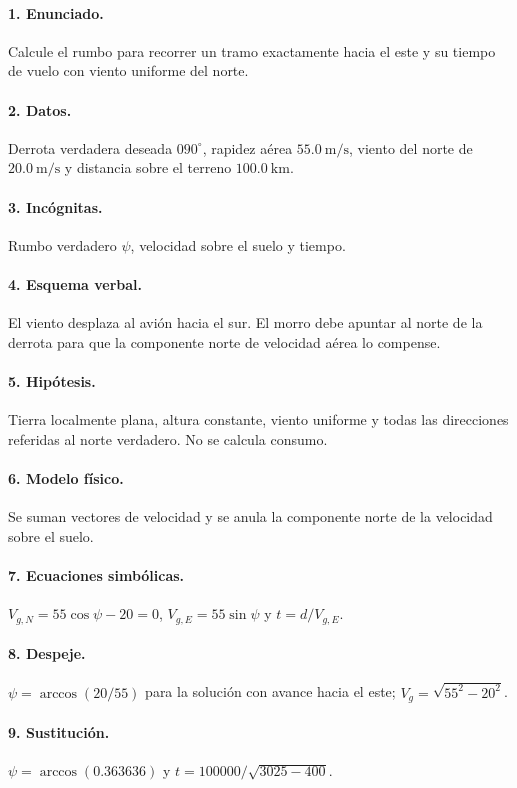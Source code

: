 \paragraph{1. Enunciado.} Calcule el rumbo para recorrer un tramo exactamente hacia el este y su tiempo de vuelo con viento uniforme del norte.
\paragraph{2. Datos.} Derrota verdadera deseada $090^\circ$, rapidez aérea $55.0\ \mathrm{m/s}$, viento del norte de $20.0\ \mathrm{m/s}$ y distancia sobre el terreno $100.0\ \mathrm{km}$.
\paragraph{3. Incógnitas.} Rumbo verdadero $\psi$, velocidad sobre el suelo y tiempo.
\paragraph{4. Esquema verbal.} El viento desplaza al avión hacia el sur. El morro debe apuntar al norte de la derrota para que la componente norte de velocidad aérea lo compense.
\paragraph{5. Hipótesis.} Tierra localmente plana, altura constante, viento uniforme y todas las direcciones referidas al norte verdadero. No se calcula consumo.
\paragraph{6. Modelo físico.} Se suman vectores de velocidad y se anula la componente norte de la velocidad sobre el suelo.
\paragraph{7. Ecuaciones simbólicas.} $V_{g,N}=55\cos\psi-20=0$, $V_{g,E}=55\sin\psi$ y $t=d/V_{g,E}$.
\paragraph{8. Despeje.} $\psi=\arccos(20/55)$ para la solución con avance hacia el este; $V_g=\sqrt{55^2-20^2}$.
\paragraph{9. Sustitución.} $\psi=\arccos(0.363636)$ y $t=100000/\sqrt{3025-400}$.
